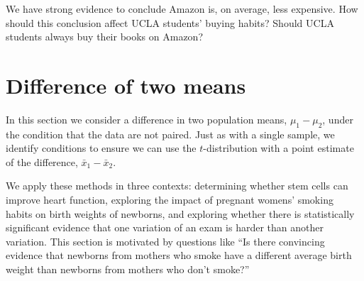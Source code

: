 \begin{exercisewrap}
\begin{nexercise}
We have strong evidence to conclude Amazon is,
on average, less expensive.
How should this conclusion affect UCLA students'
buying habits?
Should UCLA students always buy their books
on Amazon?\footnotemark{}
\end{nexercise}
\end{exercisewrap}




\section{Difference of two means}
\label{differenceOfTwoMeans}

\noindent%
In this section we consider a difference in two population means, $\mu_1 - \mu_2$, under the condition that the data are not paired. Just as with a single sample, we identify conditions to ensure we can use the $t$-distribution with a point estimate of the difference, $\bar{x}_1 - \bar{x}_2$.

We apply these methods in three contexts: determining whether stem cells can improve heart function, exploring the impact of pregnant womens' smoking habits on birth weights of newborns, and exploring whether there is statistically significant evidence that one variation of an exam is harder than another variation. This section is motivated by questions like ``Is there convincing evidence that newborns from mothers who smoke have a different average birth weight than newborns from mothers who don't smoke?''

